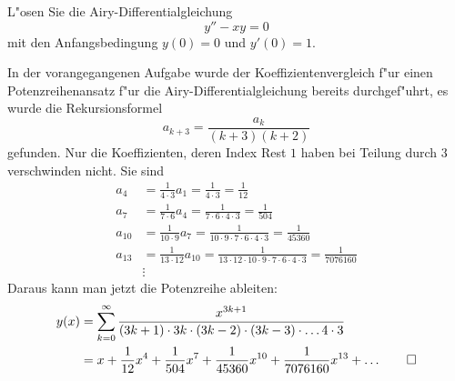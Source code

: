 L"osen Sie die Airy-Differentialgleichung
\[
y''-xy=0
\]
mit den Anfangsbedingung $y(0)=0$ und $y'(0)=1$.
%

\begin{loesung}
In der vorangegangenen Aufgabe wurde der Koeffizientenvergleich f"ur einen
Potenzreihenansatz f"ur die Airy-Differentialgleichung bereits durchgef"uhrt,
es wurde die Rekursionsformel
\[
a_{k+3}=\frac{a_k}{(k+3)(k+2)}
\]
gefunden.
Nur die Koeffizienten, deren Index Rest $1$ haben bei Teilung durch $3$
verschwinden nicht.
Sie sind
\begin{align*}
a_4&=\frac1{4\cdot 3}a_1=\frac1{4\cdot 3}=\frac1{12}
\\
a_7&=\frac1{7\cdot 6}a_4=\frac1{7\cdot 6\cdot 4\cdot 3}=\frac1{504}
\\
a_{10}&=\frac1{10\cdot 9}a_7
=
\frac1{10\cdot 9\cdot 7\cdot 6\cdot 4\cdot 3}=\frac1{45360}
\\
a_{13}&=\frac1{13\cdot 12}a_{10}=
\frac1{13\cdot 12\cdot 10\cdot 9\cdot 7\cdot 6\cdot 4\cdot 3}=\frac1{7076160}
\\
&\vdots
\end{align*}
Daraus kann man jetzt die Potenzreihe ableiten:
\begin{align*}
y(x)
&=
\sum_{k=0}^\infty \frac{x^{3k+1}}{(3k+1)\cdot3k\cdot (3k-2)\cdot(3k-3)\cdot \dots 4\cdot 3}
\\
&=
x + \frac1{12}x^4+\frac1{504}x^7+\frac1{45360}x^{10}+\frac1{7076160}x^{13}+\dots
\qedhere
\end{align*}
\end{loesung}

